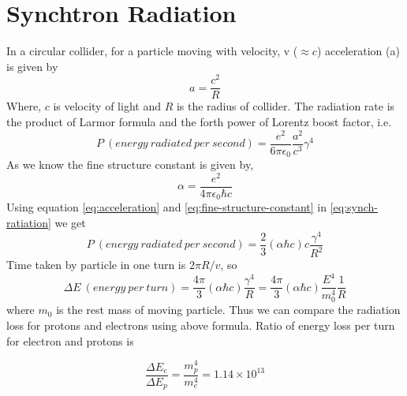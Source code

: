 \chapter{Synchtron Radiation} %
\label{cha:synchtron_radiation}
In a circular collider, for a particle moving with velocity, v ($\approx c$) acceleration (a) is given by
\begin{equation}\label{eq:acceleration}
	a = \frac{c^2}{R}
\end{equation}
Where, $c$ is velocity of light and $R$ is the radius of collider. The radiation rate is the product of Larmor formula and the forth power of Lorentz boost factor, i.e.
\begin{equation}\label{eq:synch-ratiation}
	P~(energy~radiated~per~second) = \frac{e^2}{6\pi \epsilon_0} \frac{a^2}{c^3} \gamma^4
\end{equation}
As we know the fine structure constant is given by,
\begin{equation}\label{eq:fine-structure-constant}
	\alpha = \frac{e^2}{4 \pi \epsilon_0 \hbar c}
\end{equation}
Using equation \ref{eq:acceleration} and \ref{eq:fine-structure-constant} in \ref{eq:synch-ratiation} we get
\begin{equation}
	P~(energy~radiated~per~second) = \frac{2}{3}(\alpha \hbar c) c \frac{\gamma^4}{R^2}
\end{equation}
Time taken by particle in one turn is $2\pi R/v$, so
\begin{equation}
	\Delta E~(energy~per~turn) = \frac{4\pi}{3}(\alpha \hbar c) \frac{\gamma^4}{R} = \frac{4\pi}{3}(\alpha \hbar c) \frac{E^4}{m^4_0}\frac{1}{R} 
\end{equation}
where $m_0$ is the rest mass of moving particle. Thus we can compare the radiation loss for protons and electrons using above formula. Ratio of energy loss per turn for electron and protons is

\begin{equation}
	\frac{\Delta E_e}{\Delta E_p} = \frac{m_p^4}{m_e^4} = 1.14 \times 10^{13}
\end{equation}

